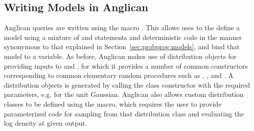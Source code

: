 \subsection{Writing Models in Anglican}
\label{sec:probprog:anglican:models} 

Anglican queries are written using the macro .  This allows uses to the define a model using a mixture
of \sample and \observe statements and deterministic code in the manner synonymous to that explained in
Section~\ref{sec:probprog:models}, and bind that model to a variable.  
As before, Anglican makes use of distribution objects for providing inputs to \sample and \observe, for which
it provides a number of common constructors corresponding to common
elementary random procedures such
as \gammaa, \normal, and \betaa.  A distribution objects is generated by calling the class constructor
with the required parameters, e.g. {\small {}} for the unit Gaussian.
Anglican also allows custom distribution classes to be defined using
the  macro, which requires the user to provide parameterized code for sampling from that distribution
class and evaluating the log density at given output.

